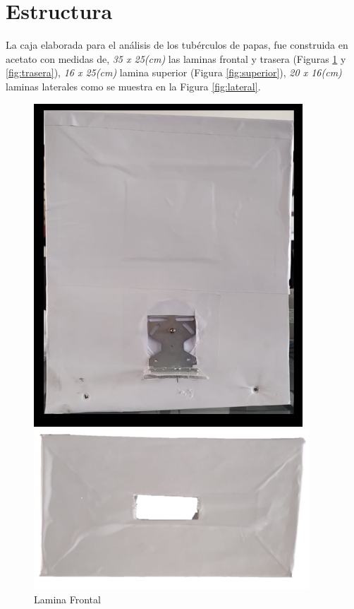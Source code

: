 \newpage	
	\section{Estructura}
		La caja elaborada para el análisis de los tubérculos de papas, fue construida en acetato con medidas de, \textit{35 x 25(cm)} las laminas frontal y trasera (Figuras \ref{fig:frontal} y \ref{fig:trasera}), \textit{16 x 25(cm)} lamina superior (Figura \ref{fig:superior}), \textit{20 x 16(cm)} laminas laterales como se muestra en la Figura \ref{fig:lateral}.
		
		\begin{figure}[H]
			\begin{minipage}[b]{0.35\linewidth}
				\centering
				\centering
				\includegraphics[width=\linewidth]{Figs/300.png}
				\caption{Lamina Frontal}
				\label{fig:frontal}
			\end{minipage}
			\hspace{2.5cm}
			\begin{minipage}[b]{0.35\linewidth}
				\centering
				\centering
				\includegraphics[width=\linewidth]{Figs/301.png}

\end{minipage}
\end{figure}
